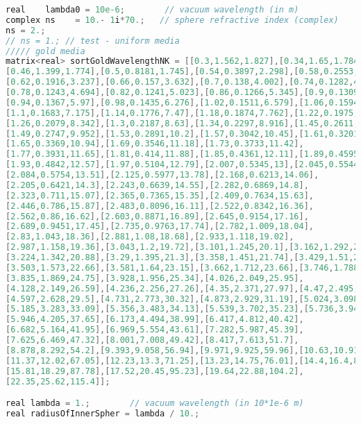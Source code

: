 \begin{lstlisting}[language=C]
real    lambda0 = 10e-6;        // vacuum wavelength (in m)
complex ns    = 10.- 1i*70.;   // sphere refractive index (complex)
ns = 2.;
// ns = 1.; // test - uniform media
///// gold media
matrix<real> sortGoldWavelengthNK = [[0.3,1.562,1.827],[0.34,1.65,1.784],[0.38,1.55,1.832],[0.42,1.533,1.85],
[0.46,1.399,1.774],[0.5,0.8181,1.745],[0.54,0.3897,2.298],[0.58,0.2553,2.803],
[0.62,0.1916,3.237],[0.66,0.157,3.632],[0.7,0.138,4.002],[0.74,0.1282,4.354],
[0.78,0.1243,4.694],[0.82,0.1241,5.023],[0.86,0.1266,5.345],[0.9,0.1309,5.66],
[0.94,0.1367,5.97],[0.98,0.1435,6.276],[1.02,0.1511,6.579],[1.06,0.1594,6.878],
[1.1,0.1683,7.175],[1.14,0.1776,7.47],[1.18,0.1874,7.762],[1.22,0.1975,8.053],
[1.26,0.2079,8.342],[1.3,0.2187,8.63],[1.34,0.2297,8.916],[1.45,0.2611,9.698],
[1.49,0.2747,9.952],[1.53,0.2891,10.2],[1.57,0.3042,10.45],[1.61,0.3201,10.7],
[1.65,0.3369,10.94],[1.69,0.3546,11.18],[1.73,0.3733,11.42],
[1.77,0.3931,11.65],[1.81,0.414,11.88],[1.85,0.4361,12.11],[1.89,0.4595,12.34],
[1.93,0.4842,12.57],[1.97,0.5104,12.79],[2.007,0.5345,13],[2.045,0.5544,13.25],
[2.084,0.5754,13.51],[2.125,0.5977,13.78],[2.168,0.6213,14.06],
[2.205,0.6421,14.3],[2.243,0.6639,14.55],[2.282,0.6869,14.8],
[2.323,0.711,15.07],[2.365,0.7365,15.35],[2.409,0.7634,15.63],
[2.446,0.786,15.87],[2.483,0.8096,16.11],[2.522,0.8342,16.36],
[2.562,0.86,16.62],[2.603,0.8871,16.89],[2.645,0.9154,17.16],
[2.689,0.9451,17.45],[2.735,0.9763,17.74],[2.782,1.009,18.04],
[2.83,1.043,18.36],[2.881,1.08,18.68],[2.933,1.118,19.02],
[2.987,1.158,19.36],[3.043,1.2,19.72],[3.101,1.245,20.1],[3.162,1.292,20.48],
[3.224,1.342,20.88],[3.29,1.395,21.3],[3.358,1.451,21.74],[3.429,1.51,22.19],
[3.503,1.573,22.66],[3.581,1.64,23.15],[3.662,1.712,23.66],[3.746,1.788,24.2],
[3.835,1.869,24.75],[3.928,1.956,25.34],[4.026,2.049,25.95],
[4.128,2.149,26.59],[4.236,2.256,27.26],[4.35,2.371,27.97],[4.47,2.495,28.71],
[4.597,2.628,29.5],[4.731,2.773,30.32],[4.873,2.929,31.19],[5.024,3.098,32.12],
[5.185,3.283,33.09],[5.356,3.483,34.13],[5.539,3.702,35.23],[5.736,3.942,36.4],
[5.946,4.205,37.65],[6.173,4.494,38.99],[6.417,4.812,40.42],
[6.682,5.164,41.95],[6.969,5.554,43.61],[7.282,5.987,45.39],
[7.625,6.469,47.32],[8.001,7.008,49.42],[8.417,7.613,51.7],
[8.878,8.292,54.2],[9.393,9.058,56.94],[9.971,9.925,59.96],[10.63,10.91,63.31],
[11.37,12.02,67.05],[12.23,13.3,71.25],[13.23,14.75,76.01],[14.4,16.4,81.46],
[15.81,18.29,87.78],[17.52,20.45,95.23],[19.64,22.88,104.2],
[22.35,25.62,115.4]];

real lambda = 1.;        // vacuum wavelength (in 10*1e-6 m)
real radiusOfInnerSpher = lambda / 10.;


\end{lstlisting}
